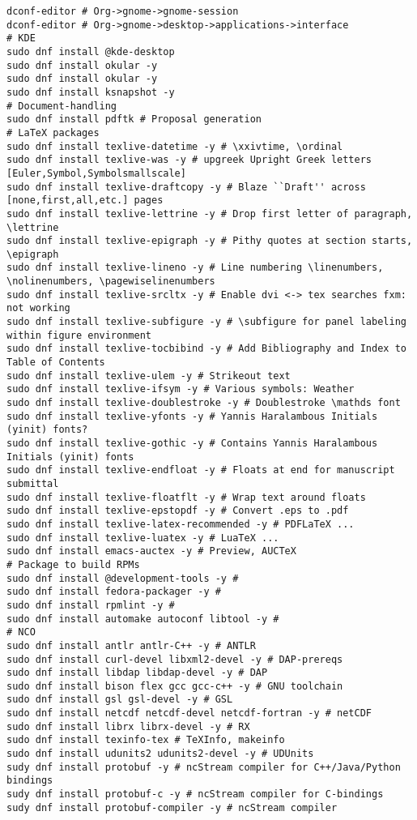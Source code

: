 \documentclass[12pt,twoside]{article}
\begin{document}
\begin{verbatim}
dconf-editor # Org->gnome->gnome-session
dconf-editor # Org->gnome->desktop->applications->interface
# KDE
sudo dnf install @kde-desktop
sudo dnf install okular -y 
sudo dnf install okular -y
sudo dnf install ksnapshot -y
# Document-handling
sudo dnf install pdftk # Proposal generation
# LaTeX packages
sudo dnf install texlive-datetime -y # \xxivtime, \ordinal
sudo dnf install texlive-was -y # upgreek Upright Greek letters [Euler,Symbol,Symbolsmallscale]
sudo dnf install texlive-draftcopy -y # Blaze ``Draft'' across [none,first,all,etc.] pages
sudo dnf install texlive-lettrine -y # Drop first letter of paragraph, \lettrine
sudo dnf install texlive-epigraph -y # Pithy quotes at section starts, \epigraph
sudo dnf install texlive-lineno -y # Line numbering \linenumbers, \nolinenumbers, \pagewiselinenumbers
sudo dnf install texlive-srcltx -y # Enable dvi <-> tex searches fxm: not working
sudo dnf install texlive-subfigure -y # \subfigure for panel labeling within figure environment
sudo dnf install texlive-tocbibind -y # Add Bibliography and Index to Table of Contents
sudo dnf install texlive-ulem -y # Strikeout text
sudo dnf install texlive-ifsym -y # Various symbols: Weather
sudo dnf install texlive-doublestroke -y # Doublestroke \mathds font
sudo dnf install texlive-yfonts -y # Yannis Haralambous Initials (yinit) fonts?
sudo dnf install texlive-gothic -y # Contains Yannis Haralambous Initials (yinit) fonts
sudo dnf install texlive-endfloat -y # Floats at end for manuscript submittal
sudo dnf install texlive-floatflt -y # Wrap text around floats
sudo dnf install texlive-epstopdf -y # Convert .eps to .pdf
sudo dnf install texlive-latex-recommended -y # PDFLaTeX ...
sudo dnf install texlive-luatex -y # LuaTeX ...
sudo dnf install emacs-auctex -y # Preview, AUCTeX
# Package to build RPMs
sudo dnf install @development-tools -y #
sudo dnf install fedora-packager -y #
sudo dnf install rpmlint -y # 
sudo dnf install automake autoconf libtool -y #
# NCO
sudo dnf install antlr antlr-C++ -y # ANTLR
sudo dnf install curl-devel libxml2-devel -y # DAP-prereqs
sudo dnf install libdap libdap-devel -y # DAP
sudo dnf install bison flex gcc gcc-c++ -y # GNU toolchain
sudo dnf install gsl gsl-devel -y # GSL
sudo dnf install netcdf netcdf-devel netcdf-fortran -y # netCDF
sudo dnf install librx librx-devel -y # RX
sudo dnf install texinfo-tex # TeXInfo, makeinfo
sudo dnf install udunits2 udunits2-devel -y # UDUnits
sudy dnf install protobuf -y # ncStream compiler for C++/Java/Python bindings
sudy dnf install protobuf-c -y # ncStream compiler for C-bindings
sudy dnf install protobuf-compiler -y # ncStream compiler

\end{verbatim}
\end{document}
